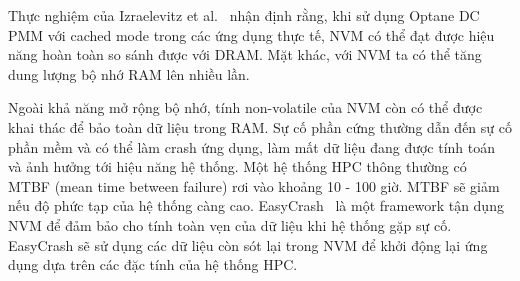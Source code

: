 Thực nghiệm của Izraelevitz et
al.~\cite{izraelevitzBasicPerformanceMeasurements2019} nhận định rằng, khi sử
dụng Optane DC PMM với cached mode trong các ứng dụng thực tế, NVM có thể đạt
được hiệu năng hoàn toàn so sánh được với DRAM. Mặt khác, với NVM ta có thể tăng
dung lượng bộ nhớ RAM lên nhiều lần.

Ngoài khả năng mở rộng bộ nhớ, tính non-volatile của NVM còn có thể được khai
thác để bảo toàn dữ liệu trong RAM. Sự cố phần cứng thường dẫn đến sự cố phần
mềm và có thể làm crash ứng dụng, làm mất dữ liệu đang được tính toán và ảnh
hưởng tới hiệu năng hệ thống. Một hệ thống HPC thông thường có MTBF (mean time
between failure) rơi vào khoảng 10 - 100 giờ. MTBF sẽ giảm nếu độ phức tạp của
hệ thống càng cao. EasyCrash~\cite{renExploringNonVolatilityNonVolatile2020} là
một framework tận dụng NVM để đảm bảo cho tính toàn vẹn của dữ liệu khi hệ thống
gặp sự cố. EasyCrash sẽ sử dụng các dữ liệu còn sót lại trong NVM để khởi động
lại ứng dụng dựa trên các đặc tính của hệ thống HPC.